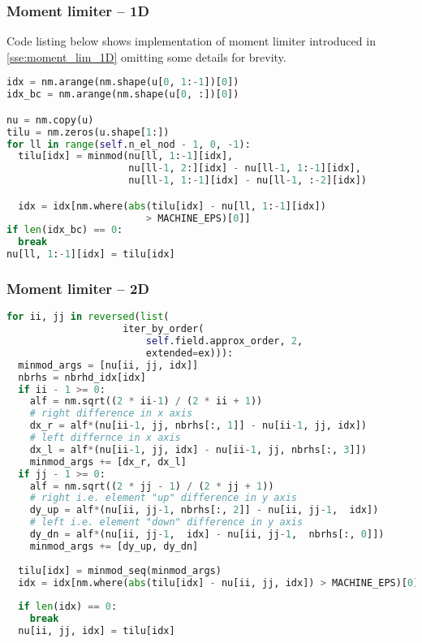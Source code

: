 \subsubsection{Moment limiter -- 1D}
\label{se:i_moment_lim_1D}
Code listing below shows implementation of moment limiter introduced in \ref{sse:moment_lim_1D} omitting some details 
for brevity.
\begin{lstlisting}[language=Python, caption=Moment limiter for 1D]
idx = nm.arange(nm.shape(u[0, 1:-1])[0])
idx_bc = nm.arange(nm.shape(u[0, :])[0])

nu = nm.copy(u)
tilu = nm.zeros(u.shape[1:])
for ll in range(self.n_el_nod - 1, 0, -1):
  tilu[idx] = minmod(nu[ll, 1:-1][idx],
                     nu[ll-1, 2:][idx] - nu[ll-1, 1:-1][idx],
					 nu[ll-1, 1:-1][idx] - nu[ll-1, :-2][idx])

  idx = idx[nm.where(abs(tilu[idx] - nu[ll, 1:-1][idx])
						> MACHINE_EPS)[0]]
if len(idx_bc) == 0:
  break
nu[ll, 1:-1][idx] = tilu[idx]
\end{lstlisting}


\subsubsection{Moment limiter -- 2D}
\label{se:i_moment_lim_2D}
\begin{lstlisting}[language=Python, caption=Moment limiter for 
cartesian grid]
for ii, jj in reversed(list(
					iter_by_order(
						self.field.approx_order, 2,
						extended=ex))):
  minmod_args = [nu[ii, jj, idx]]
  nbrhs = nbrhd_idx[idx]
  if ii - 1 >= 0:
  	alf = nm.sqrt((2 * ii-1) / (2 * ii + 1))
  	# right difference in x axis
  	dx_r = alf*(nu[ii-1, jj, nbrhs[:, 1]] - nu[ii-1, jj, idx])
  	# left differnce in x axis
  	dx_l = alf*(nu[ii-1, jj, idx] - nu[ii-1, jj, nbrhs[:, 3]])
  	minmod_args += [dx_r, dx_l]
  if jj - 1 >= 0:
  	alf = nm.sqrt((2 * jj - 1) / (2 * jj + 1))
  	# right i.e. element "up" difference in y axis
  	dy_up = alf*(nu[ii, jj-1, nbrhs[:, 2]] - nu[ii, jj-1,  idx])
  	# left i.e. element "down" difference in y axis
  	dy_dn = alf*(nu[ii, jj-1,  idx] - nu[ii, jj-1,  nbrhs[:, 0]])
  	minmod_args += [dy_up, dy_dn]
  	
  tilu[idx] = minmod_seq(minmod_args)
  idx = idx[nm.where(abs(tilu[idx] - nu[ii, jj, idx]) > MACHINE_EPS)[0]]
  
  if len(idx) == 0:
  	break
  nu[ii, jj, idx] = tilu[idx]
\end{lstlisting}


